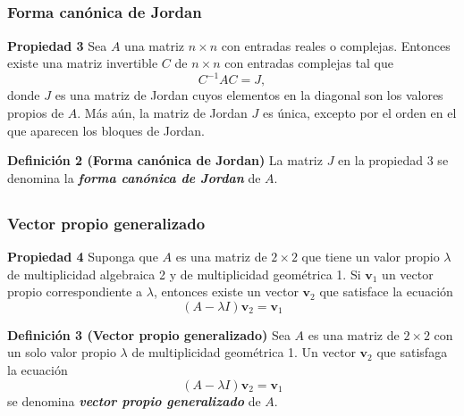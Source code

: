 
\subsection{} 

{\nologo 
\begin{frame}\frametitle{Forma canónica de Jordan}
	
	\begin{prop}{\textbf{Propiedad 3}}\justifying
		Sea $A$ una matriz $n\times n$ con entradas reales o complejas. Entonces existe una matriz invertible $C$ de 
		$n\times n$ con entradas complejas tal que
		\[
		C^{-1}AC = J,
		\]
		donde $J$ es una matriz de Jordan cuyos elementos en la diagonal son los valores propios de $A$. 
		Más aún, la matriz de Jordan $J$ es única, excepto por el orden en el que aparecen los bloques de Jordan.
	\end{prop}
	
	\vspace{5mm}
	\begin{block}{\textbf{Definición 2 (Forma canónica de Jordan)}}
	La matriz $J$ en la propiedad 3 se denomina la \textbf{\textit{forma canónica de Jordan}} de $A$.
	\end{block}
		
\end{frame}
}


\subsection{} 

{\nologo 
\begin{frame}\frametitle{Vector propio generalizado}
	
	\begin{prop}{\textbf{Propiedad 4}}\justifying
		Suponga que $A$ es una matriz de $2\times 2$ que tiene un valor propio $\lambda$ de multiplicidad 
		algebraica 2 y de multiplicidad geométrica 1. Si $\mathbf{v}_1$ un vector propio correspondiente a
		$\lambda$, entonces existe un vector $\mathbf{v}_2$ que satisface la ecuación
		\[
			(A-\lambda I) \mathbf{v}_2 = \mathbf{v}_1
		\]
	\end{prop}
	
	\vspace{0mm}
	\begin{block}{\textbf{Definición 3 (Vector propio generalizado)}}
		Sea $A$ es una matriz de $2\times 2$ con un solo valor propio $\lambda$ de multiplicidad 
		geométrica 1. Un vector $\mathbf{v}_2$ que satisfaga la ecuación
		\[
		(A-\lambda I) \mathbf{v}_2 = \mathbf{v}_1
		\]
		se denomina \textbf{\textit{vector propio generalizado}} de $A$.
	\end{block}
	
\end{frame}
}

